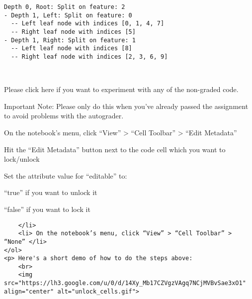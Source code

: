 \documentclass[11pt]{article}
\begin{document}
    \begin{Verbatim}[commandchars=\\\{\}]
 Depth 0, Root: Split on feature: 2
- Depth 1, Left: Split on feature: 0
  -- Left leaf node with indices [0, 1, 4, 7]
  -- Right leaf node with indices [5]
- Depth 1, Right: Split on feature: 1
  -- Left leaf node with indices [8]
  -- Right leaf node with indices [2, 3, 6, 9]
    \end{Verbatim}

    \begin{center}
    \end{center}
    { \hspace*{\fill} \\}
    
    Please click here if you want to experiment with any of the non-graded
code.

Important Note: Please only do this when you've already passed the
assignment to avoid problems with the autograder.

On the notebook's menu, click ``View'' \textgreater{} ``Cell Toolbar''
\textgreater{} ``Edit Metadata''

Hit the ``Edit Metadata'' button next to the code cell which you want to
lock/unlock

Set the attribute value for ``editable'' to:

``true'' if you want to unlock it

``false'' if you want to lock it

\begin{verbatim}
    </li>
    <li> On the notebook’s menu, click “View” > “Cell Toolbar” > “None” </li>
</ol>
<p> Here's a short demo of how to do the steps above: 
    <br>
    <img src="https://lh3.google.com/u/0/d/14Xy_Mb17CZVgzVAgq7NCjMVBvSae3xO1" align="center" alt="unlock_cells.gif">
\end{verbatim}


    
    
    
\end{document}
